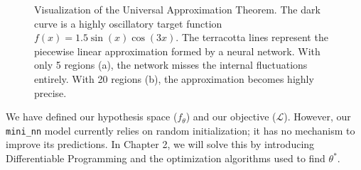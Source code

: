 \documentclass{tufte-handout}
\begin{document}
\begin{figure}[htbp]
{}
\caption{Visualization of the Universal Approximation Theorem. The dark curve is a highly oscillatory target function $f(x) = 1.5\sin(x)\cos(3x)$. The terracotta lines represent the piecewise linear approximation formed by a neural network. With only 5 regions (a), the network misses the internal fluctuations entirely. With 20 regions (b), the approximation becomes highly precise.}
\label{fig:UAT}
\end{figure}

\begin{remark}
    We have defined our hypothesis space ($f_\theta$) and our objective ($\mathcal{L}$). However, our \texttt{mini\_nn} model currently relies on random initialization; it has no mechanism to improve its predictions. In Chapter 2, we will solve this by introducing Differentiable Programming and the optimization algorithms used to find $\theta^*$.
\end{remark}
\end{document}
